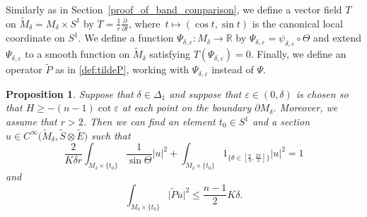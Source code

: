 \documentclass[pdftex]{sigma}
\numberwithin{equation}{section}
\newtheorem{Proposition}[Theorem]{Proposition}
 { \theoremstyle{definition}
\newtheorem{Definition}[Theorem]{Definition}
\newtheorem{Note}[Theorem]{Note}
\newtheorem{Example}[Theorem]{Example}
\newtheorem{Remark}[Theorem]{Remark} }
\newcommand{\R}{\mathbb{R}}
\begin{document}
Similarly as in Section~\ref{proof_of_band_comparison}, we define a vector field $T$ on $\tilde{M}_\delta = M_\delta \times S^1$ by $T = \frac{1}{r} \frac{\partial}{\partial t}$, where~${t \mapsto (\cos t,\sin t)}$ is the canonical local coordinate on $S^1$.
We define a function ${\Psi_{\delta,\varepsilon}\colon M_\delta\! \to \R}$ by $\Psi_{\delta,\varepsilon} = \psi_{\delta,\varepsilon} \circ \Theta$ and extend $\Psi_{\delta,\varepsilon}$ to a smooth function on $\tilde{M}_\delta$ satisfying $T(\Psi_{\delta,\varepsilon}) = 0$.
Finally, we define an operator $\tilde{P}$ as in \eqref{def:tildeP}, working with $\Psi_{\delta, \varepsilon}$ instead of $\Psi$.

\begin{Proposition}
\label{existence_of_spinor_even_dim_2}
Suppose that $\delta \in \Delta_1$ and suppose that $\varepsilon \in (0,\delta)$ is chosen so that $H \geq -(n-1) \cot \varepsilon$ at each point on the boundary $\partial M_\delta$. Moreover, we assume that $r > 2$. Then we can find an element $t_0 \in S^1$ and a section $u \in C^\infty\big(\tilde{M}_\delta,\tilde{S} \otimes \tilde{E}\big)$ such that
\[\frac{2}{K\delta r} \int_{M_\delta \times \{t_0\}} \frac{1}{\sin \Theta} |u|^2 + \int_{M_\delta \times \{t_0\}} 1_{\{\theta \in [\frac{\pi}{3},\frac{2\pi}{3}]\}} |u|^2 = 1\]
and
\[\int_{M_\delta \times \{t_0\}} \big|\tilde{P} u\big|^2 \leq \frac{n-1}{2} K\delta.\]
\end{Proposition}
\end{document}
